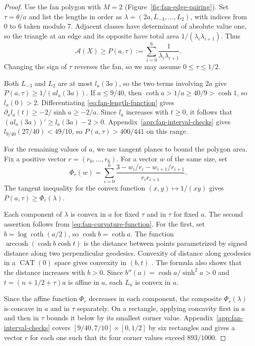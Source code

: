 \documentclass[10pt,twoside]{article}
\theoremstyle{plain}
\theoremstyle{definition}
\theoremstyle{remark}
\newcommand{\A}{\mathcal A}
\begin{document}
\begin{proof}
Use the fan polygon with $M=2$ (Figure~\ref{fig:fan-edge-pairing}).
Set $\tau=\theta/a$ and list the lengths in order as
$\lambda=(2a,L_{-3},\ldots,L_2)$, with indices from $0$ to $6$
taken modulo $7$. Adjacent classes have determinant of
absolute value one, so the triangle at an edge and its opposite
have total area $1/(\lambda_i\lambda_{i+1})$. Thus
$$
\A(X)\geq P(a,\tau):=\sum_{i=0}^{6}\frac{1}{\lambda_i\lambda_{i+1}}.
$$
Changing the sign of $\tau$ reverses the fan, so we may assume
$0\leq\tau\leq1/2$.

Both $L_{-3}$ and $L_2$ are at most $l_a(3a)$, so the two terms
involving $2a$ give $P(a,\tau)\geq1/(a l_a(3a))$. If $a\leq9/40$,
then $\coth a>1/a\geq40/9>\cosh 1$, so $l_a(0)>2$.
Differentiating \eqref{eq:fan-length-function} gives
$\partial_a l_a(t)\geq-2/\sinh a\geq-2/a$. Since $l_a$ increases
with $t\geq0$, it follows that
$(a l_a(3a))'\geq l_a(3a)-2>0$.
Appendix~\ref{app:fan-interval-checks} gives $l_{9/40}(27/40)<49/10$,
so $P(a,\tau)>400/441$ on this range.

For the remaining values of $a$, we use tangent planes to bound the
polygon area. Fix a positive vector $r=(r_0,\ldots,r_6)$.
For a vector $w$ of the same size, set
\begin{equation}
\label{eq:short-fan-tangent}
\Phi_r(w)=\sum_{i=0}^{6}
\frac{3-w_i/r_i-w_{i+1}/r_{i+1}}{r_i r_{i+1}}.
\end{equation}
The tangent inequality for the convex function $(x,y)\mapsto1/(xy)$
gives $P(a,\tau)\geq\Phi_r(\lambda)$.

Each component of $\lambda$ is convex in $a$ for fixed $\tau$ and in
$\tau$ for fixed $a$. The second assertion follows from
\eqref{eq:fan-curvature-function}. For the first, set
$b=\log\coth(a/2)$, so $\cosh b=\coth a$. The function
$\operatorname{arccosh}(\cosh b\cosh t)$ is the distance between
points parametrized by signed distance along two perpendicular
geodesics. Convexity of distance along geodesics in a
$\operatorname{CAT}(0)$ space gives convexity in $(b,t)$
\cite[Proposition~II.2.2, page~176]{BridsonHaefliger}.
The formula also shows that the distance increases with $b>0$.
Since $b''(a)=\cosh a/\sinh^2a>0$ and
$t=(n+1/2+\tau)a$ is affine in $a$, each $L_n$ is convex in $a$.

Since the affine function $\Phi_r$ decreases in each component,
the composite $\Phi_r(\lambda)$ is concave in $a$ and in $\tau$
separately. On a rectangle, applying concavity first in $a$ and
then in $\tau$ bounds it below by its smallest corner value.
Appendix~\ref{app:fan-interval-checks} covers
$[9/40,7/10]\times[0,1/2]$ by six rectangles and gives a vector $r$
for each one such that its four corner values exceed $893/1000$.
\end{proof}
\end{document}
